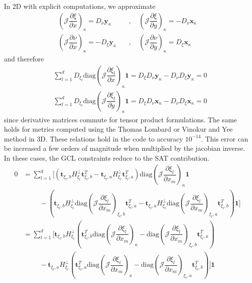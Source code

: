 \documentclass[12pt,a4paper]{article}
\newcommand{\pder}[2][]{\dfrac{\partial #1}{\partial #2}} %
\newcommand{\fn}[1]{\mathcal{#1}} %
\begin{document}
In 2D with explicit computations, we approximate
\begin{align*}
 \left( \fn{J} \pder[\xi]{x} \right)_\kappa = D_\nu \bm{y}_\kappa \quad &, \quad  \left( \fn{J} \pder[\xi]{y} \right)_\kappa = - D_\nu \bm{x}_\kappa \\
  \left( \fn{J} \pder[\nu]{x} \right)_\kappa = - D_\xi \bm{y}_\kappa \quad &, \quad  \left( \fn{J} \pder[\nu]{y} \right)_\kappa = D_\xi \bm{x}_\kappa
\end{align*}
and therefore
\begin{align*}
 &\sum_{l=1}^d  D_{\xi_l} \text{diag} \left( \fn{J} \pder[\xi_l]{x} \right)_\kappa \bm{1} = D_\xi D_\nu \bm{y}_\kappa - D_\nu D_\xi \bm{y}_\kappa = 0 \\
 & \sum_{l=1}^d  D_{\xi_l} \text{diag} \left( \fn{J} \pder[\xi_l]{y} \right)_\kappa \bm{1} = D_\xi D_\nu \bm{x}_\kappa - D_\nu D_\xi \bm{x}_\kappa = 0 
\end{align*}
since derivative matrices commute for tensor product formulations. The same holds for metrics computed using the Thomas Lombard or Vinokur and Yee method in 3D. These relations hold in the code to accuracy $10^{-14}$. This error can be increased a few orders of magnitude when multiplied by the jacobian inverse. In these cases, the GCL constraints reduce to the SAT contribution.
\begin{align*}
0 &= \sum_{l=1}^d \Bigg[ \left( \bm{t}_{\xi_l,b} H^{\bot}_{\xi_l} \bm{t}_{\xi_l,b}^T - \bm{t}_{\xi_l,a} H^{\bot}_{\xi_l} \bm{t}_{\xi_l,a}^T \right) \text{diag}  \left( \fn{J} \pder[\xi_l]{x_m} \right)_{\kappa} \bm{1} \\
& \hspace{1cm} - \left( \bm{t}_{\xi_l, b} H^{\bot}_{\xi_l}  \text{diag} \left( \fn{J} \pder[\xi_l]{x_m} \right)_{\xi_l,b} \bm{t}_{\xi_l, a}^T - \bm{t}_{\xi_l, a} H^{\bot}_{\xi_l} \text{diag} \left( \fn{J} \pder[\xi_l]{x_m} \right)_{\xi_l,a} \bm{t}_{\xi_l, b}^T  \right) \bm{1} \Bigg] \\
&=  \sum_{l=1}^d \Bigg[  \bm{t}_{\xi_l,b} H^{\bot}_{\xi_l}  \left(  \bm{t}_{\xi_l,b}^T  \text{diag}  \left( \fn{J} \pder[\xi_l]{x_m} \right)_{\kappa}  - \text{diag} \left( \fn{J} \pder[\xi_l]{x_m} \right)_{\xi_l,b} \bm{t}_{\xi_l, a}^T \right) \\
& \hspace{1cm} -  \bm{t}_{\xi_l,a} H^{\bot}_{\xi_l}  \left(  \bm{t}_{\xi_l,a}^T  \text{diag}  \left( \fn{J} \pder[\xi_l]{x_m} \right)_{\kappa}  - \text{diag} \left( \fn{J} \pder[\xi_l]{x_m} \right)_{\xi_l,a} \bm{t}_{\xi_l, b}^T \right) \Bigg] \bm{1}
\end{align*}
\end{document}
